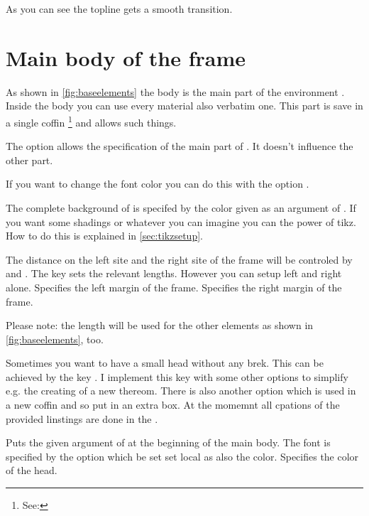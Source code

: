 \documentclass[openany,12pt,tocdepth=3]{ltx-md}
\begin{document}
As you can see the topline gets a smooth transition. 

\section{Main body of the frame}\label{sec:element-main}
As shown in \autoref{fig:baseelements} the body is the main part of
the environment . Inside the body you can use every
material also verbatim one. This part is save in a single coffin%
\footnote{See: }  and allows such things. 

The option  allows the specification of the main part of .
It doesn't influence the other part. 

If you want to change the font color you can do this with the option .

The complete background of  is specifed by the color given
as an argument of . If you want some shadings or whatever
you can imagine you can the power of tikz. How to do this
is explained in \autoref{sec:tikzsetup}.

The distance on the left site and the right site of the frame will be 
controled by  and . The 
key  sets the relevant lengths. However you can 
setup left and right alone.
Specifies the left margin of the frame.
Specifies the right margin of the frame.

\faArrowRight Please note: the length will be used for the other elements as shown in 
\autoref{fig:baseelements}, too.


Sometimes you want to have a small head without any brek. This
can be achieved by the key . I implement this key with 
some other options to simplify e.g. the creating of a new thereom. There
is also another option  which is used in a new coffin and
so put in an extra box. At the momemnt all cpations of the provided linstings
are done in the . 


Puts the given argument of  at the beginning
of the main body.
The font is specified by the option  which be set set local as
also the color.
Specifies the color of the head.
\end{document}
